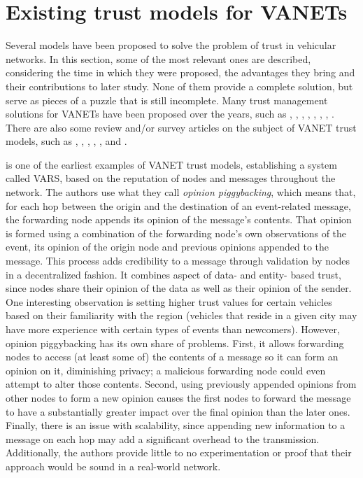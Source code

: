 


\section{Existing trust models for VANETs}
 
Several models have been proposed to solve the problem of trust in vehicular networks. 
In this section, some of the most relevant ones are described, considering the time in which they were proposed, the advantages they bring and their contributions to later study. 
None of them provide a complete solution, but serve as pieces of a puzzle that is still incomplete. 
Many trust management solutions for VANETs have been proposed over the years, such as \cite{patwardhan2006data}, \cite{gerlach2007trust}, \cite{raya2008data}, \cite{huang2010situation}, \cite{ding2013novel}, \cite{haddadou2013trust}, \cite{liu2016lsot}, \cite{kerrache2016detection}.
There are also some review and/or survey articles on the subject of VANET trust models, such as \cite{zhang2011survey}, \cite{ma2011survey}, \cite{zhang2012trust}, \cite{mejri2014survey}, \cite{soleymani2015trust} \cite{sengar2016survey}, and \cite{dwivedi2016review}. 

\cite{dotzer2005vars} is one of the earliest examples of VANET trust models, establishing a system called VARS, based on the reputation of nodes and messages throughout the network.
The authors use what they call \textit{opinion piggybacking}, which means that, for each hop between the origin and the destination of an event-related message, the forwarding node appends its opinion of the message's contents.
That opinion is formed using a combination of the forwarding node's own observations of the event, its opinion of the origin node and previous opinions appended to the message.
This process adds credibility to a message through validation by nodes in a decentralized fashion.
It combines aspect of data- and entity- based trust, since nodes share their opinion of the data as well as their opinion of the sender. 
One interesting observation is setting higher trust values for certain vehicles based on their familiarity with the region (vehicles that reside in a given city may have more experience with certain types of events than newcomers).
However, opinion piggybacking has its own share of problems.
First, it allows forwarding nodes to access (at least some of) the contents of a message so it can form an opinion on it, diminishing privacy; a malicious forwarding node could even attempt to alter those contents.
Second, using previously appended opinions from other nodes to form a new opinion causes the first nodes to forward the message to have a substantially greater impact over the final opinion than the later ones.
Finally, there is an issue with scalability, since appending new information to a message on each hop may add a significant overhead to the transmission. Additionally, the authors provide little to no experimentation or proof that their approach would be sound in a real-world network.

